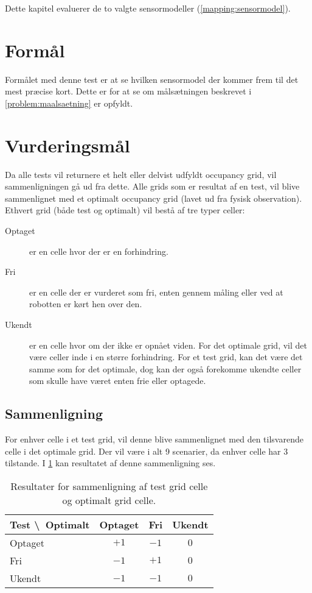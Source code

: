 Dette kapitel evaluerer de to valgte sensormodeller (\cref{mapping:sensormodel}).

\section{Formål}
Formålet med denne test er at se hvilken sensormodel der kommer frem til det mest præcise kort.
Dette er for at se om målsætningen beskrevet i \cref{problem:maalsaetning} er opfyldt.

\section{Vurderingsmål}
Da alle tests vil returnere et helt eller delvist udfyldt occupancy grid, vil sammenligningen gå ud fra dette.
Alle grids som er resultat af en test, vil blive sammenlignet med et optimalt occupancy grid (lavet ud fra fysisk observation).
Ethvert grid (både test og optimalt) vil bestå af tre typer celler:
\begin{description}
\item[Optaget]{ er en celle hvor der er en forhindring.}
\item[Fri]{ er en celle der er vurderet som fri, enten gennem måling eller ved at robotten er kørt hen over den.}
\item[Ukendt]{ er en celle hvor om der ikke er opnået viden.
For det optimale grid, vil det være celler inde i en større forhindring.
For et test grid, kan det være det samme som for det optimale, dog kan der også forekomme ukendte celler som skulle have været enten frie eller optagede.}
\end{description}

\subsection{Sammenligning}
For enhver celle i et test grid, vil denne blive sammenlignet med den tilsvarende celle i det optimale grid.
Der vil være i alt 9 scenarier, da enhver celle har 3 tilstande.
I \cref{evaluering:sammenligning} kan resultatet af denne sammenligning ses.

\begin{table}[h]
\centering
\begin{tabular}{|l|c|c|c|}
\hline
Test \textbackslash~Optimalt & Optaget & Fri & Ukendt \\ \hline
Optaget & $+1$ & $-1$ & $0$ \\ \hline
Fri & $-1$ & $+1$ & $0$ \\ \hline
Ukendt & $-1$ & $-1$ & $0$ \\ \hline
\end{tabular}
\caption{Resultater for sammenligning af test grid celle og optimalt grid celle.}
\label{evaluering:sammenligning}
\end{table}

